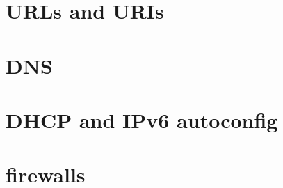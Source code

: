 \section{URLs and URIs}



\section{DNS}


\section{DHCP and IPv6 autoconfig}



\section{firewalls}

